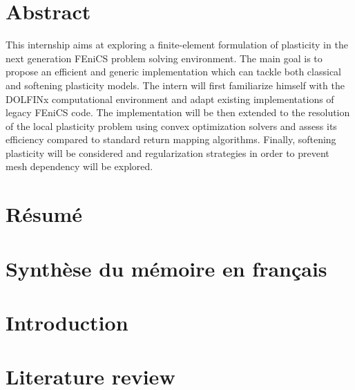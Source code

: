\documentclass[12pt]{article}
\begin{document}
\section*{\centering Abstract}
This internship aims at exploring a finite-element formulation of plasticity in the next generation FEniCS problem solving environment. The main goal is to propose an efficient and generic implementation which can tackle both classical and softening plasticity models. The intern will first familiarize himself with the DOLFINx computational environment and adapt existing implementations of legacy FEniCS code. The implementation will be then extended to the resolution of the local plasticity problem using convex optimization solvers and assess its efficiency compared to standard return mapping algorithms. Finally, softening plasticity will be considered and regularization strategies in order to prevent mesh dependency will be explored.

\newpage
\section*{\centering Résumé}

\newpage
\section*{\centering Synthèse du mémoire en français}

\renewcommand{\contentsname}{\centering Table of contents}
\renewcommand{\listtablename}{\centering List of tables}
\renewcommand{\listfigurename}{\centering List of figures}

\newpage
\tableofcontents
\newpage
{}
{}
\listoftables
\newpage
{}
{}
\listoffigures

\newpage
{}
{}
\section*{Introduction}

\newpage
\section{Literature review}
\end{document}
